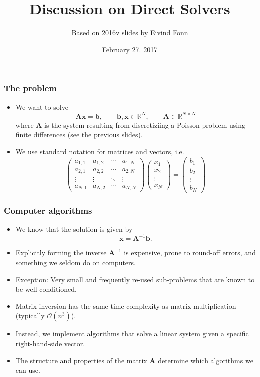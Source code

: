

\title{Discussion on Direct Solvers}
\date{February 27. 2017}
\author{Based on 2016v slides by Eivind Fonn}


\maketitle

\begin{frame}
  \frametitle{The problem}
  \begin{itemize}
  \item We want to solve
    \[
      \bm A \bm x = \bm b, \qquad
      \bm b, \bm x \in \mathbb{R}^N, \qquad
      \bm A \in \mathbb{R}^{N \times N}
    \]
    where $\bm A$ is the system resulting from discretiziing a Poisson problem
    using finite differences (see the previous slides).
  \item We use standard notation for matrices and vectors, i.e.
    \[
      \begin{pmatrix}
        a_{1,1} & a_{1,2} & \cdots & a_{1,N} \\
        a_{2,1} & a_{2,2} & \cdots & a_{2,N} \\
        \vdots  & \vdots  & \ddots & \vdots  \\
        a_{N,1} & a_{N,2} & \cdots & a_{N,N}
      \end{pmatrix}
      \begin{pmatrix} x_1 \\ x_2 \\ \vdots \\ x_N \end{pmatrix} =
      \begin{pmatrix} b_1 \\ b_2 \\ \vdots \\ b_N \end{pmatrix}
    \]
  \end{itemize}
\end{frame}

\begin{frame}
  \frametitle{Computer algorithms}
  \begin{itemize}
  \item We know that the solution is given by
    \[ \bm x = \bm A^{-1} \bm b. \]
  \item Explicitly forming the inverse $\bm A^{-1}$ is expensive, prone to
    round-off errors, and something we seldom do on computers.
  \item Exception: Very small and frequently re-used sub-problems that are known
    to be well conditioned.
  \item Matrix inversion has the same time complexity as matrix multiplication
    (typically $\mathcal{O}(n^3)$).
  \item Instead, we implement algorithms that solve a linear system given a
    specific right-hand-side vector.
  \item The structure and properties of the matrix $\bm A$ determine which
    algorithms we can use.
  \end{itemize}
\end{frame}

